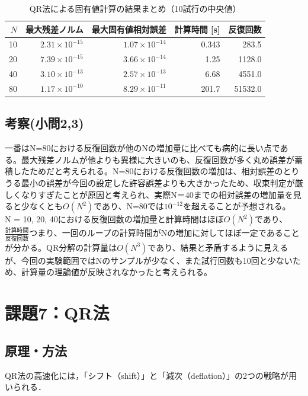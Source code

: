 \documentclass[a4paper,11pt]{ltjsarticle}
\begin{document}
\begin{table}[H]
\centering
\caption{QR法による固有値計算の結果まとめ（10試行の中央値）}
\label{tab:exp5_summary}
\begin{tabular}{r|r|r|r|r}
\hline
$N$ & 最大残差ノルム & 最大固有値相対誤差 & 計算時間 [s] & 反復回数 \\
\hline
10  & $2.31\times10^{-15}$ & $1.07\times10^{-14}$ & 0.343 & 283.5 \\
20  & $7.39\times10^{-15}$ & $3.66\times10^{-14}$ & 1.25 & 1128.0 \\
40  & $3.10\times10^{-13}$ & $2.57\times10^{-13}$ & 6.68 & 4551.0 \\
80  & $1.17\times10^{-10}$ & $8.29\times10^{-11}$ & 201.7 & 51532.0 \\
\hline
\end{tabular}
\end{table}

\subsection{考察(小問2,3)}
一番はN=80における反復回数が他のNの増加量に比べても病的に長い点である。最大残差ノルムが他よりも異様に大きいのも、反復回数が多く丸め誤差が蓄積したためだと考えられる。N=80における反復回数の増加は、相対誤差のとりうる最小の誤差が今回の設定した許容誤差よりも大きかったため、収束判定が厳しくなりすぎたことが原因と考えられ、実際N＝40までの相対誤差の増加量を見ると少なくとも$O(N^2)$であり、N=80では$10^{-12}$を超えることが予想される。\\

N = 10, 20, 40における反復回数の増加量と計算時間はほぼ$O(N^2)$であり、$\frac{計算時間}{反復回数} $つまり、一回のループの計算時間がNの増加に対してほぼ一定であることが分かる。QR分解の計算量は$O(N^3)$であり、結果と矛盾するように見えるが、今回の実験範囲ではNのサンプルが少なく、また試行回数も10回と少ないため、計算量の理論値が反映されなかったと考えられる。\\

\section{課題7：QR法}
\subsection{原理・方法}

QR法の高速化には，「シフト（shift）」と「減次（deflation）」の2つの戦略が用いられる\cite{exp2025}．
\end{document}

